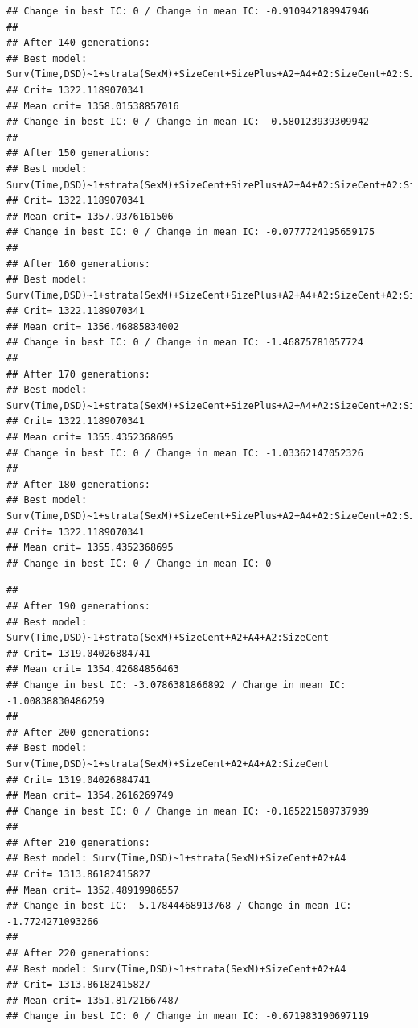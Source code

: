 \documentclass{article}\usepackage[]{graphicx}\usepackage[]{color}
\makeatletter
\newenvironment{kframe}{%
 \def\at@end@of@kframe{}%
 \ifinner\ifhmode%
  \def\at@end@of@kframe{\end{minipage}}%
  \begin{minipage}{\columnwidth}%
 \fi\fi%
 \def\FrameCommand##1{\hskip\@totalleftmargin \hskip-\fboxsep
 \colorbox{shadecolor}{##1}\hskip-\fboxsep
     \hskip-\linewidth \hskip-\@totalleftmargin \hskip\columnwidth}%
 \MakeFramed {\advance\hsize-\width
   \@totalleftmargin\z@ \linewidth\hsize
   \@setminipage}}%
 {\par\unskip\endMakeFramed%
 \at@end@of@kframe}
\newenvironment{knitrout}{}{} %
\makeatother
\begin{document}
\begin{knitrout}
\begin{kframe}
\begin{verbatim}
## Change in best IC: 0 / Change in mean IC: -0.910942189947946
## 
## After 140 generations:
## Best model: Surv(Time,DSD)~1+strata(SexM)+SizeCent+SizePlus+A2+A4+A2:SizeCent+A2:SizePlus
## Crit= 1322.1189070341
## Mean crit= 1358.01538857016
## Change in best IC: 0 / Change in mean IC: -0.580123939309942
## 
## After 150 generations:
## Best model: Surv(Time,DSD)~1+strata(SexM)+SizeCent+SizePlus+A2+A4+A2:SizeCent+A2:SizePlus
## Crit= 1322.1189070341
## Mean crit= 1357.9376161506
## Change in best IC: 0 / Change in mean IC: -0.0777724195659175
## 
## After 160 generations:
## Best model: Surv(Time,DSD)~1+strata(SexM)+SizeCent+SizePlus+A2+A4+A2:SizeCent+A2:SizePlus
## Crit= 1322.1189070341
## Mean crit= 1356.46885834002
## Change in best IC: 0 / Change in mean IC: -1.46875781057724
## 
## After 170 generations:
## Best model: Surv(Time,DSD)~1+strata(SexM)+SizeCent+SizePlus+A2+A4+A2:SizeCent+A2:SizePlus
## Crit= 1322.1189070341
## Mean crit= 1355.4352368695
## Change in best IC: 0 / Change in mean IC: -1.03362147052326
## 
## After 180 generations:
## Best model: Surv(Time,DSD)~1+strata(SexM)+SizeCent+SizePlus+A2+A4+A2:SizeCent+A2:SizePlus
## Crit= 1322.1189070341
## Mean crit= 1355.4352368695
## Change in best IC: 0 / Change in mean IC: 0
\end{verbatim}


{\ttfamily\noindent\color{warningcolor}{\#\# Warning in fitter(X, Y, strats, offset, init, control, weights = weights, : Loglik converged before variable\ \ 3 ; beta may be infinite.}}\begin{verbatim}
## 
## After 190 generations:
## Best model: Surv(Time,DSD)~1+strata(SexM)+SizeCent+A2+A4+A2:SizeCent
## Crit= 1319.04026884741
## Mean crit= 1354.42684856463
## Change in best IC: -3.0786381866892 / Change in mean IC: -1.00838830486259
## 
## After 200 generations:
## Best model: Surv(Time,DSD)~1+strata(SexM)+SizeCent+A2+A4+A2:SizeCent
## Crit= 1319.04026884741
## Mean crit= 1354.2616269749
## Change in best IC: 0 / Change in mean IC: -0.165221589737939
## 
## After 210 generations:
## Best model: Surv(Time,DSD)~1+strata(SexM)+SizeCent+A2+A4
## Crit= 1313.86182415827
## Mean crit= 1352.48919986557
## Change in best IC: -5.17844468913768 / Change in mean IC: -1.7724271093266
## 
## After 220 generations:
## Best model: Surv(Time,DSD)~1+strata(SexM)+SizeCent+A2+A4
## Crit= 1313.86182415827
## Mean crit= 1351.81721667487
## Change in best IC: 0 / Change in mean IC: -0.671983190697119
\end{verbatim}



\end{kframe}
\end{knitrout}
\end{document}
